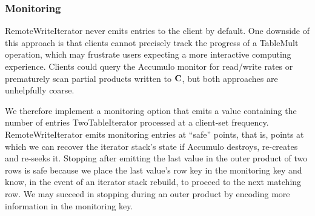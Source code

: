 \subsubsection{Monitoring}
RemoteWriteIterator never emits entries to the client by default. 
One downside of this approach is that clients cannot precisely track the progress of a TableMult operation,
which may frustrate users expecting a more interactive computing experience.
Clients could query the Accumulo monitor for read/write rates 
or prematurely scan partial products written to $\mathbf{C}$, but both approaches are unhelpfully coarse.

We therefore implement a monitoring option that emits a value
containing the number of entries TwoTableIterator processed
at a client-set frequency.
RemoteWriteIterator emits monitoring entries at ``safe'' points, that is,
points at which we can recover the iterator stack's state 
if Accumulo destroys, re-creates and re-seeks it.
Stopping after emitting the last value in the outer product of two rows is safe 
because we place the last value's row key in the monitoring key and know, 
in the event of an iterator stack rebuild, to proceed to the next matching row.
We may succeed in stopping during an outer product 
by encoding more information in the monitoring key.




 



